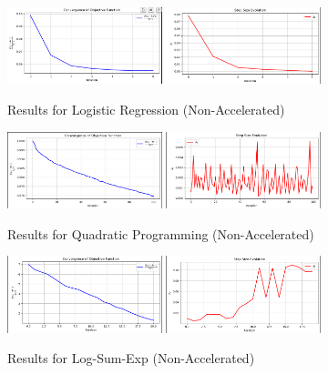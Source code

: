 \documentclass{article}
\begin{document}
\begin{figure}[htbp]
    \centering
    \includegraphics[width=0.4\textwidth]{11.png}
    \includegraphics[width=0.4\textwidth]{12.png}
    \caption{Results for Logistic Regression (Non-Accelerated)}
\end{figure}

\begin{figure}[htbp]
    \centering
    \includegraphics[width=0.4\textwidth]{21.png}
    \includegraphics[width=0.4\textwidth]{22.png}
    \caption{Results for Quadratic Programming (Non-Accelerated)}
\end{figure}

\begin{figure}[htbp]
    \centering
    \includegraphics[width=0.4\textwidth]{31.png}
    \includegraphics[width=0.4\textwidth]{32.png}
    \caption{Results for Log-Sum-Exp (Non-Accelerated)}
\end{figure}
\end{document}
